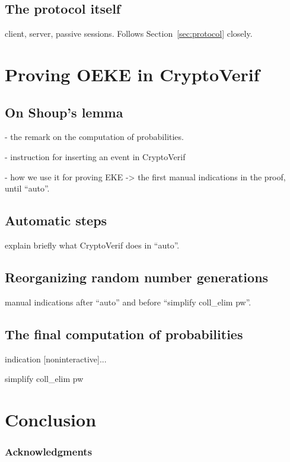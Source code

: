\documentclass[runningheads]{llncs}
\begin{document}
\subsection{The protocol itself}

client, server, passive sessions.
Follows Section~\ref{sec:protocol} closely.


\section{Proving OEKE in CryptoVerif}
\label{sec:proof}


\subsection{On Shoup's lemma}

- the remark on the computation of probabilities.

- instruction for inserting an event in CryptoVerif

- how we use it for proving EKE -> the first manual indications
in the proof, until ``auto''.

\subsection{Automatic steps}

explain briefly what CryptoVerif does in ``auto''.

\subsection{Reorganizing random number generations}

manual indications after ``auto'' and before ``simplify coll\_elim pw''.

\subsection{The final computation of probabilities}

indication [noninteractive]...

simplify coll\_elim pw

\section{Conclusion}\label{sec:concl}


\subsubsection*{Acknowledgments}

%


  
\end{document}
